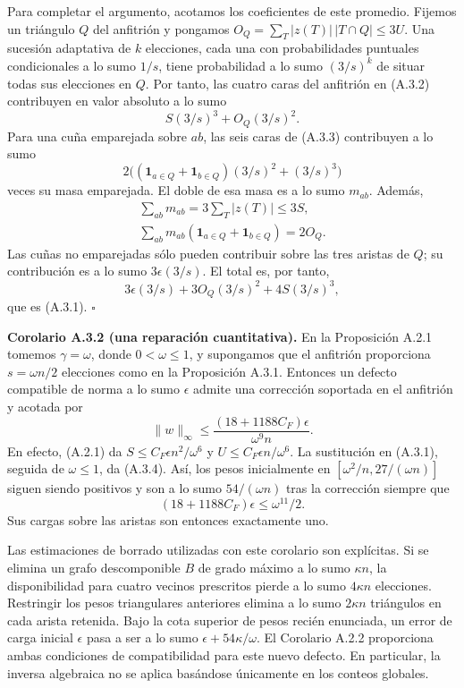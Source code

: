 \documentclass[spanish,11pt,a4paper]{article}
\begin{document}
Para completar el argumento, acotamos los coeficientes de este promedio. Fijemos un triángulo \(Q\) del anfitrión y pongamos \(O_Q=\sum_T|z(T)|\,|T\cap Q|\le3U\). Una sucesión adaptativa de \(k\) elecciones, cada una con probabilidades puntuales condicionales a lo sumo \(1/s\), tiene probabilidad a lo sumo \((3/s)^k\) de situar todas sus elecciones en \(Q\). Por tanto, las cuatro caras del anfitrión en (A.3.2) contribuyen en valor absoluto a lo sumo \[S(3/s)^3+O_Q(3/s)^2.\] Para una cuña emparejada sobre \(ab\), las seis caras de (A.3.3) contribuyen a lo sumo \[2\bigl((\mathbf1_{a\in Q}+\mathbf1_{b\in Q})(3/s)^2+(3/s)^3\bigr)\] veces su masa emparejada. El doble de esa masa es a lo sumo \(m_{ab}\). Además, \[\begin{gathered}
\sum_{ab}m_{ab}=3\sum_T|z(T)|\le3S,\\
\sum_{ab}m_{ab}(\mathbf1_{a\in Q}+\mathbf1_{b\in Q})=2O_Q.
\end{gathered}\] Las cuñas no emparejadas sólo pueden contribuir sobre las tres aristas de \(Q\); su contribución es a lo sumo \(3\epsilon(3/s)\). El total es, por tanto, \[3\epsilon(3/s)+3O_Q(3/s)^2+4S(3/s)^3,\] que es (A.3.1). \(\square\)

\textbf{Corolario A.3.2 (una reparación cuantitativa).} En la Proposición A.2.1 tomemos \(\gamma=\omega\), donde \(0<\omega\le1\), y supongamos que el anfitrión proporciona \(s=\omega n/2\) elecciones como en la Proposición A.3.1. Entonces un defecto compatible de norma a lo sumo \(\epsilon\) admite una corrección soportada en el anfitrión y acotada por \[\|w\|_\infty\le
\frac{(18+1188C_F)\epsilon}{\omega^9n}.
\tag{A.3.4}\] En efecto, (A.2.1) da \(S\le C_F\epsilon n^2/\omega^6\) y \(U\le C_F\epsilon n/\omega^6\). La sustitución en (A.3.1), seguida de \(\omega\le1\), da (A.3.4). Así, los pesos inicialmente en \([\omega^2/n,27/(\omega n)]\) siguen siendo positivos y son a lo sumo \(54/(\omega n)\) tras la corrección siempre que \[(18+1188C_F)\epsilon\le\omega^{11}/2.
\tag{A.3.5}\] Sus cargas sobre las aristas son entonces exactamente uno.

Las estimaciones de borrado utilizadas con este corolario son explícitas. Si se elimina un grafo descomponible \(B\) de grado máximo a lo sumo \(\kappa n\), la disponibilidad para cuatro vecinos prescritos pierde a lo sumo \(4\kappa n\) elecciones. Restringir los pesos triangulares anteriores elimina a lo sumo \(2\kappa n\) triángulos en cada arista retenida. Bajo la cota superior de pesos recién enunciada, un error de carga inicial \(\epsilon\) pasa a ser a lo sumo \(\epsilon+54\kappa/\omega\). El Corolario A.2.2 proporciona ambas condiciones de compatibilidad para este nuevo defecto. En particular, la inversa algebraica no se aplica basándose únicamente en los conteos globales.
\end{document}
